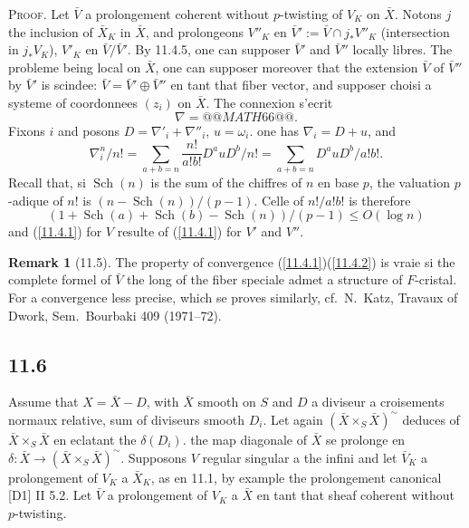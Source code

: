 \documentclass[12pt,a4paper]{article}
\theoremstyle{plain}
\theoremstyle{definition}
\newtheorem{remark}[theorem]{Remark}
\theoremstyle{remark}
\DeclareMathOperator{\Sch}{Sch}
\begin{document}
\textsc{Proof.} Let $\bar{V}$ a prolongement coherent without $p$-twisting of $V_K$ on $\bar{X}$. Notons $j$ the inclusion of $\bar{X}_K$ in $\bar{X}$, and prolongeons $V''_K$ en $\bar{V}' := \bar{V} \cap j_* V''_K$ (intersection in $j_* V_K$), $V'_K$ en $\bar{V}/\bar{V}'$. By 11.4.5, one can supposer $\bar{V}'$ and $\bar{V}''$ locally libres. The probleme being local on $\bar{X}$, one can supposer moreover that the extension $\bar{V}$ of $\bar{V}''$ by $\bar{V}'$ is scindee: $\bar{V} = \bar{V}' \oplus \bar{V}''$ en tant that fiber vector, and supposer choisi a systeme of coordonnees $(z_i)$ on $\bar{X}$. The connexion s'ecrit
$$\nabla = @@MATH66@@.$$
Fixons $i$ and posons $D = \nabla'_i + \nabla''_i$, $u = \omega_i$. one has $\nabla_i = D + u$, and
$$\nabla_i^n/n! = \sum_{a+b=n} \frac{n!}{a! b!} D^a u D^b / n! = \sum_{a+b=n} D^a u D^b / a! b!.$$
Recall that, si $\Sch(n)$ is the sum of the chiffres of $n$ en base $p$, the valuation $p$-adique of $n!$ is $(n - \Sch(n))/(p-1)$. Celle of $n!/a! b!$ is therefore
$$(1 + \Sch(a) + \Sch(b) - \Sch(n))/(p-1) \leq O(\log n)$$
and (\ref{11.4.1}) for $V$ resulte of (\ref{11.4.1}) for $V'$ and $V''$.


\begin{remark}[11.5]
The property of convergence (\ref{11.4.1})(\ref{11.4.2}) is vraie si the complete formel of $\bar{V}$ the long of the fiber speciale admet a structure of $F$-cristal. For a convergence less precise, which se proves similarly, cf.~N.~Katz, Travaux of Dwork, Sem.~Bourbaki 409 (1971--72).
\end{remark}

\subsection*{11.6}

Assume that $X = \bar{X} - D$, with $\bar{X}$ smooth on $S$ and $D$ a diviseur a croisements normaux relative, sum of diviseurs smooth $D_i$. Let again $(\bar{X} \times_S \bar{X})^\sim$ deduces of $\bar{X} \times_S \bar{X}$ en eclatant the $\delta(D_i)$. the map diagonale of $\bar{X}$ se prolonge en $\delta: \bar{X} \to (\bar{X} \times_S \bar{X})^\sim$. Supposons $V$ regular singular a the infini and let $\bar{V}_K$ a prolongement of $V_K$ a $\bar{X}_K$, as en 11.1, by example the prolongement canonical [D1] II 5.2. Let $\bar{V}$ a prolongement of $V_K$ a $\bar{X}$ en tant that sheaf coherent without $p$-twisting.
\end{document}

